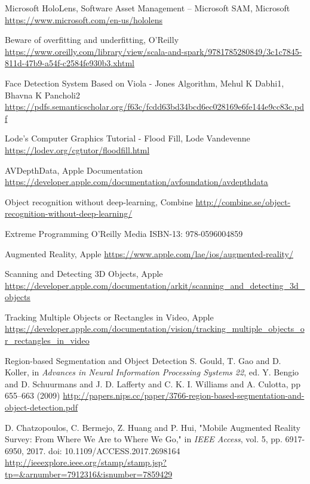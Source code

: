 \begin{thebibliography}{X}
Microsoft HoloLens, Software Asset Management – Microsoft SAM, Microsoft
\url{https://www.microsoft.com/en-us/hololens}

Beware of overfitting and underfitting, O'Reilly
\url{https://www.oreilly.com/library/view/scala-and-spark/9781785280849/3c1c7845-811d-47b9-a54f-c2584fe930b3.xhtml}

Face Detection System Based on Viola - Jones Algorithm, Mehul K Dabhi1, Bhavna K Pancholi2
\url{https://pdfs.semanticscholar.org/f63c/fcdd63bd34bcd6ec028169e6fe144e9cc83c.pdf}

Lode's Computer Graphics Tutorial - Flood Fill, Lode Vandevenne
\url{https://lodev.org/cgtutor/floodfill.html}

AVDepthData, Apple Documentation
\url{https://developer.apple.com/documentation/avfoundation/avdepthdata}

Object recognition without deep-learning, Combine
\url{http://combine.se/object-recognition-without-deep-learning/}

Extreme Programming
O'Reilly Media
ISBN-13: 978-0596004859

Augmented Reality, Apple
\url{https://www.apple.com/lae/ios/augmented-reality/}

Scanning and Detecting 3D Objects, Apple
\url{https://developer.apple.com/documentation/arkit/scanning_and_detecting_3d_objects}

Tracking Multiple Objects or Rectangles in Video, Apple
\url{https://developer.apple.com/documentation/vision/tracking_multiple_objects_or_rectangles_in_video}

Region-based Segmentation and Object Detection
S. Gould, T. Gao and D. Koller, in \textit{Advances in Neural Information Processing Systems 22}, 
ed. Y. Bengio and D. Schuurmans and J. D. Lafferty 
and C. K. I. Williams and A. Culotta, 
pp 655--663
(2009)
\url{http://papers.nips.cc/paper/3766-region-based-segmentation-and-object-detection.pdf}

D. Chatzopoulos, C. Bermejo, Z. Huang and P. Hui, "Mobile Augmented Reality Survey: From Where We Are to Where We Go," in \textit{IEEE Access}, vol. 5, pp. 6917-6950, 2017.
doi: 10.1109/ACCESS.2017.2698164
\url{http://ieeexplore.ieee.org/stamp/stamp.jsp?tp=&arnumber=7912316&isnumber=7859429}


\end{thebibliography}
